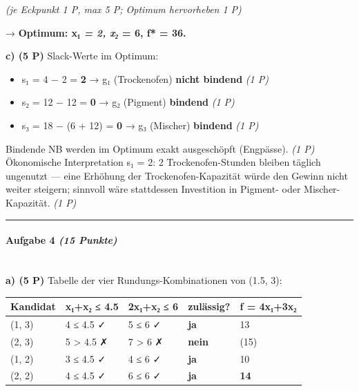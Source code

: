\documentclass[11pt, a4paper]{article}
\begin{document}
\textit{(je Eckpunkt 1 P, max 5 P; Optimum hervorheben 1 P)}


→ \textbf{Optimum: x₁\textit{ = 2, x₂} = 6, f* = 36.}


\textbf{c) (5 P)} Slack-Werte im Optimum:

\begin{itemize}
  \item s₁ = 4 − 2 = \textbf{2} → g₁ (Trockenofen) \textbf{nicht bindend} \textit{(1 P)}
  \item s₂ = 12 − 12 = \textbf{0} → g₂ (Pigment) \textbf{bindend} \textit{(1 P)}
  \item s₃ = 18 − (6 + 12) = \textbf{0} → g₃ (Mischer) \textbf{bindend} \textit{(1 P)}
\end{itemize}

Bindende NB werden im Optimum exakt ausgeschöpft (Engpässe). \textit{(1 P)} Ökonomische Interpretation s₁ = 2: 2 Trockenofen-Stunden bleiben täglich ungenutzt — eine Erhöhung der Trockenofen-Kapazität würde den Gewinn nicht weiter steigern; sinnvoll wäre stattdessen Investition in Pigment- oder Mischer-Kapazität. \textit{(1 P)}



\noindent\textcolor{rulegray}{\rule{\linewidth}{0.4pt}}


\paragraph{Aufgabe 4 \textit{(15 Punkte)}}\mbox{}\\[2pt]

\textbf{a) (5 P)} Tabelle der vier Rundungs-Kombinationen von (1.5, 3):



{\small
\begin{tabularx}{\linewidth}{XXXXX}
\hline
\rowcolor{tableheadbg}
{\color{white}\textbf{Kandidat}} & {\color{white}\textbf{x₁+x₂ ≤ 4.5}} & {\color{white}\textbf{2x₁+x₂ ≤ 6}} & {\color{white}\textbf{zulässig?}} & {\color{white}\textbf{f = 4x₁+3x₂}} \\[2pt]
\hline
\endhead
\hline
\endfoot
(1, 3) & 4 ≤ 4.5 ✓ & 5 ≤ 6 ✓ & \textbf{ja} & 13 \\
(2, 3) & 5 > 4.5 ✗ & 7 > 6 ✗ & \textbf{nein} & (15) \\
(1, 2) & 3 ≤ 4.5 ✓ & 4 ≤ 6 ✓ & \textbf{ja} & 10 \\
(2, 2) & 4 ≤ 4.5 ✓ & 6 ≤ 6 ✓ & \textbf{ja} & \textbf{14} \\
\end{tabularx}
}
\end{document}

